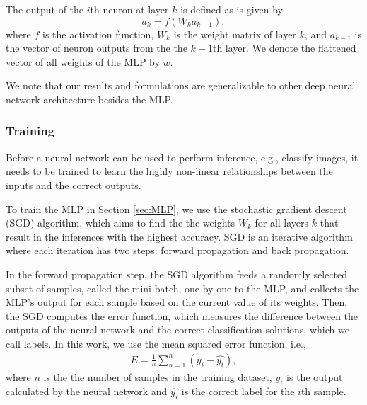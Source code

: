 \documentclass[conference]{IEEEtran}
\begin{document}
The output of the $i$th neuron at layer $k$ is defined as is given by 
$$a_k=f(W_k a_{k-1}),$$
where $f$ is the activation function, $W_k$ is the weight matrix of layer $k$,
and $a_{k-1}$ is the vector of neuron outputs from the the $k-1$th layer. 
We denote the flattened vector of all weights of the MLP by $w$. 


We note that our results and formulations are generalizable to other deep neural network architecture besides the MLP. 

\subsubsection{Training}\label{sec:training}
Before a neural network can be used to perform inference, e.g., classify images, it needs to be trained to learn the highly non-linear
relationships between the inputs and the correct outputs. 

To train the MLP in Section \ref{sec:MLP}, we use the stochastic gradient descent (SGD) algorithm, which aims to find the 
the weights $W_k$ for all layers $k$ that result in the inferences with the highest accuracy.  SGD is an iterative algorithm where each
iteration has two steps: forward propagation and back propagation.

In the forward propagation step, the SGD algorithm feeds a randomly
selected subset of samples, called the mini-batch, one by one to the MLP, and collects the MLP's output for each sample based on the
current value of its weights.
Then, the SGD computes the error function, which measures the difference between the outputs of the neural network and the correct 
classification solutions, which we call labels. In this work, we use the mean squared error function, i.e., 
\begin{align}\label{eq:errorFunction}
 E= \frac{1}{n} \sum_{n=1}^{n}(y_i -\hat{y_i}),
\end{align}
where $n$ is the the number of samples in the training dataset, $y_i$ is the output calculated by the neural network and 
$\hat{y_i}$ is the correct label for the $i$th sample.
\end{document}
